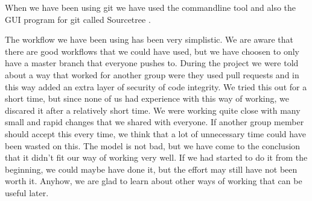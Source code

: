 When we have been using git we have used the commandline tool and also the GUI
program for git called Sourcetree \cite{SourceTree}.

The workflow we have been using has been very simplistic. We are aware that
there are good workflows that we could have used, but we have choosen to only
have a master branch that everyone pushes to. During the project we were told
about a way that worked for another group were they used pull requests and in
this way added an extra layer of security of code integrity. We tried this out
for a short time, but since none of us had experience with this way of working,
we discared it after a relatively short time. We were working quite close with
many small and rapid changes that we shared with everyone. If another group
member should accept this every time, we think that a lot of unnecessary time
could have been wasted on this. The model is not bad, but we have come to the
conclusion that it didn't fit our way of working very well. If we had started 
to do it from the beginning, we could maybe have done it, but the effort may
still have not been worth it. Anyhow, we are glad to learn about other ways of
working that can be useful later.